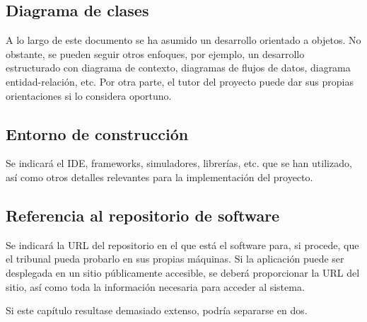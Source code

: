 \subsection{Diagrama de clases}
A lo largo de este documento se ha asumido un desarrollo orientado a objetos. No obstante, se pueden seguir otros enfoques, por ejemplo, un desarrollo estructurado con diagrama de contexto, diagramas de flujos de datos, diagrama entidad-relación, etc. Por otra parte, el tutor del proyecto puede dar sus propias orientaciones si lo considera oportuno.

\subsection{Entorno de construcción}
Se indicará el IDE, frameworks, simuladores, librerías, etc. que se han utilizado, así como otros detalles relevantes para la implementación del proyecto.

\subsection{Referencia al repositorio de software}
Se indicará la URL del repositorio en el que está el software para, si procede, que el tribunal pueda probarlo en sus propias máquinas. Si la aplicación puede ser desplegada en un sitio públicamente accesible, se deberá proporcionar la URL del sitio, así como toda la información necesaria para acceder al sistema.

Si este capítulo resultase demasiado extenso, podría separarse en dos.

